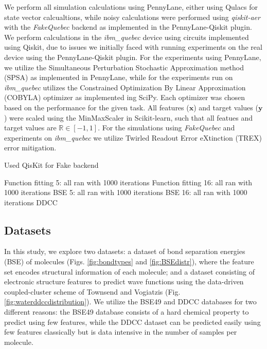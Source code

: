 \documentclass[journal=jacsat,manuscript=article]{achemso}
\begin{document}
We perform all simulation calculations using PennyLane\cite{bergholm_pennylane_2022}, either using Qulacs\cite{suzuki_qulacs_2021} for state vector calcualtions, while noisy calculations were performed using \textit{qiskit-aer} with the \textit{FakeQuebec} backend as implemented in the PennyLane-Qiskit plugin.\cite{javadi-abhari_quantum_2024}
We perform calculations in the \textit{ibm\_quebec} device using circuits implemented using Qiskit\cite{javadi-abhari_quantum_2024}, due to issues we initially faced with running experiments on the real device using the PennyLane-Qiskit plugin.
For the experiments using PennyLane,  we utilize the Simultaneous Perturbation Stochastic Approximation method (SPSA) as implemented in PennyLane, while for the experiments run on \textit{ibm\_quebec} utilizes the Constrained Optimization By Linear Approximation (COBYLA) optimizer as implemented ing SciPy\cite{virtanen_scipy_2020}.
Each optimizer was chosen based on the performance for the given task.
All features ($\mathbf{x}$) and target values ($\mathbf{y}$) were scaled using the MinMaxScaler in Scikit-learn\cite{pedregosa_scikit-learn_2011}, such that all featues and target values are $\mathbb{R}\in [ -1,1 ]$.
For the simulations using \textit{FakeQuebec} and experiments on \textit{ibm\_quebec} we utilize Twirled Readout Error eXtinction (TREX) error mitigation.



Used QisKit for Fake backend



Function fitting 5: all ran with 1000 iterations
Function fitting 16: all ran with 1000 iterations
BSE 5: all ran with 1000 iterations
BSE 16: all ran with 1000 iterations
DDCC

\subsection{Datasets}\label{subsection:datasets}
In this study, we explore two datasets: a dataset of bond separation energies (BSE) of molecules (Figs. \ref{fig:bondtypes} and \ref{fig:BSEdistr}), where the feature set encodes structural information of each molecule;
and a dataset consisting of electronic structure features to predict wave functions using the data-driven coupled-cluster scheme of Townsend and Vogiatzis (Fig. \ref{fig:waterddccdistribution}).\cite{townsend_data-driven_2019}
We utilize the BSE49 and DDCC databases for two different reasons: the BSE49 database consists of a hard chemical property to predict using few features, while the DDCC dataset can be predicted easily using few features classically but is data intensive in the number of samples per molecule.
\end{document}
